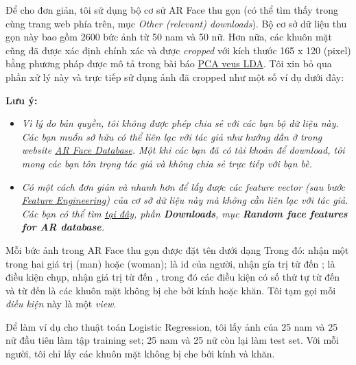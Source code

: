 Để cho đơn giản, tôi sử dụng bộ cơ sử AR Face thu gọn (có thể tìm thấy trong cùng trang web phía trên, mục \textit{Other (relevant) downloads}). Bộ cơ sở dữ liệu thu gọn này bao gồm 2600 bức ảnh từ 50 nam và 50 nữ. Hơn nữa, các khuôn mặt cũng đã được xác định chính xác và được \textit{cropped} với kích thước 165 x 120 (pixel) bằng phương pháp được mô tả trong bài báo \href{http://lectures.molgen.mpg.de/networkanalysis13/PCAversusLDA_eigenfaces.pdf}{PCA veus LDA}. Tôi xin bỏ qua phần xử lý này và trực tiếp sử dụng ảnh đã cropped như một số ví dụ dưới đây: 
 
 
\textbf{Lưu ý:} 
\begin{itemize}
    \item \textit{Vì lý do bản quyền, tôi không được phép chia sẻ với các bạn bộ dữ liệu này. Các bạn muốn sở hữu có thể liên lạc với tác giả như hướng dẫn ở trong website \href{http://www2.ece.ohio-state.edu/~aleix/ARdatabase.html}{AR Face Database}. Một khi các bạn đã có tài khoản để download, tôi mong các bạn tôn trọng tác giả và không chia sẻ trực tiếp với bạn bè.} 

    \item \textit{Có một cách đơn giản và nhanh hơn để lấy được các feature vector (sau bước \href{http://machinelearningcoban.com/general/2017/02/06/featureengineering/}{Feature Engineering})  của cơ sở dữ liệu này mà không cần liên lạc với tác giả. Các bạn có thể tìm  \href{https://www.umiacs.umd.edu/~zhuolin/projectlcksvd.html}{tại đây}, phần \textbf{Downloads}, mục \textbf{Random face features for AR database}.} 
\end{itemize}
 
Mỗi bức ảnh trong AR Face thu gọn được đặt tên dưới dạng  Trong đó:  nhận một trong hai giá trị  (man) hoặc  (woman);  là id của người, nhận gía trị từ  đến ;  là điều kiện chụp, nhận giá trị từ  đến , trong đó các điều kiện có số thứ tự từ  đến  và từ  đến  là các khuôn mặt không bị che bởi kính hoặc khăn. Tôi tạm gọi mỗi \textit{điều kiện} này là một \textit{view}. 
 
Để làm ví dụ cho thuật toán Logistic Regression, tôi lấy ảnh của 25 nam và 25 nữ đầu tiên làm tập training set; 25 nam và 25 nữ còn lại làm test set. Với mỗi người, tôi chỉ lấy các khuôn mặt không bị che bởi kính và khăn. 
 
